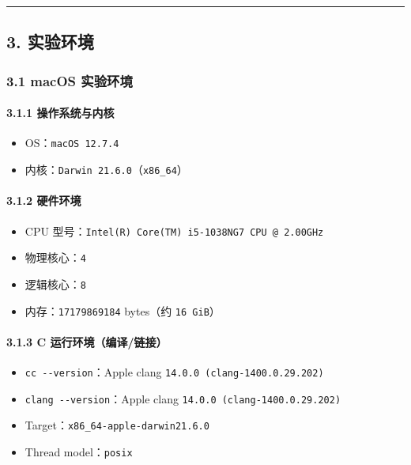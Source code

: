 \documentclass[12pt,fontset=none]{ctexart}
\providecommand{\tightlist}{%
  \setlength{\itemsep}{0pt}\setlength{\parskip}{0pt}}
\begin{document}
\begin{center}\rule{0.5\linewidth}{0.5pt}\end{center}

\subsection{3. 实验环境}\label{3-ux5b9eux9a8cux73afux5883}

\subsubsection{3.1 macOS
实验环境}\label{31-macos-ux5b9eux9a8cux73afux5883}

\paragraph{3.1.1
操作系统与内核}\label{311-ux64cdux4f5cux7cfbux7edfux4e0eux5185ux6838}

\begin{itemize}
\tightlist
\item
  OS：\texttt{macOS\ 12.7.4}
\item
  内核：\texttt{Darwin\ 21.6.0}（\texttt{x86\_64}）
\end{itemize}

\paragraph{3.1.2 硬件环境}\label{312-ux786cux4ef6ux73afux5883}

\begin{itemize}
\tightlist
\item
  CPU 型号：\texttt{Intel(R)\ Core(TM)\ i5-1038NG7\ CPU\ @\ 2.00GHz}
\item
  物理核心：\texttt{4}
\item
  逻辑核心：\texttt{8}
\item
  内存：\texttt{17179869184} bytes（约 \texttt{16\ GiB}）
\end{itemize}

\paragraph{3.1.3 C
运行环境（编译/链接）}\label{313-c-ux8fd0ux884cux73afux5883ux7f16ux8bd1ux94feux63a5}

\begin{itemize}
\tightlist
\item
  \texttt{cc\ -\/-version}：Apple clang
  \texttt{14.0.0\ (clang-1400.0.29.202)}
\item
  \texttt{clang\ -\/-version}：Apple clang
  \texttt{14.0.0\ (clang-1400.0.29.202)}
\item
  Target：\texttt{x86\_64-apple-darwin21.6.0}
\item
  Thread model：\texttt{posix}
\end{itemize}
\end{document}
